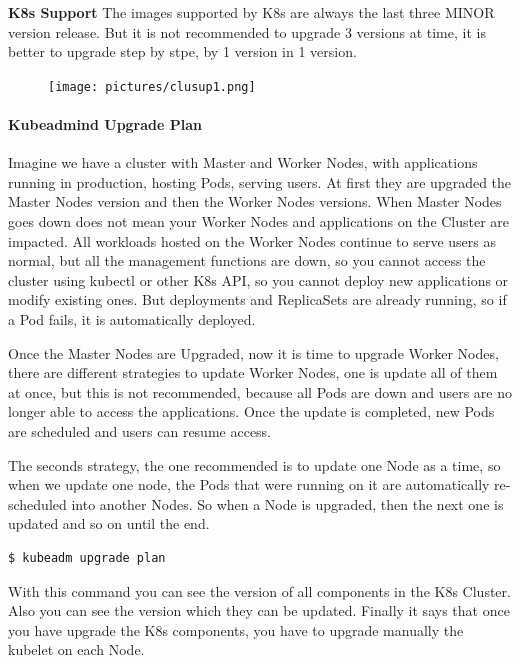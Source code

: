 \documentclass{article}
\newenvironment{codetemplate}[1][]{%
  \mybasecolorbox[#1]
  \itshape
}{%
  \endmybasecolorbox
}
\begin{document}
\textbf{K8s Support}
The images supported by K8s are always the last three MINOR version release. But it is not recommended to upgrade 3 versions at time, it is better to upgrade step by stpe, by 1 version in 1 version.

\begin{figure}[H]
    \texttt{[image: pictures/clusup1.png]}
\end{figure}

\paragraph{Kubeadmind Upgrade Plan}

Imagine we have a cluster with Master and Worker Nodes, with applications running in production, hosting Pods, serving users. At first they are upgraded the Master Nodes version and then the Worker Nodes versions. When Master Nodes goes down does not mean your Worker Nodes and applications on the Cluster are impacted. All workloads hosted on the Worker Nodes continue to serve users as normal, but all the management functions are down, so you cannot access the cluster using kubectl or other K8s API, so you cannot deploy new applications or modify existing ones.  But deployments and ReplicaSets are already running, so if a Pod fails, it is automatically deployed.

Once the Master Nodes are Upgraded, now it is time to upgrade Worker Nodes, there are different strategies to update Worker Nodes, one is update all of them at once, but this is not recommended, because all Pods are down and users are no longer able to access the applications. Once the update is completed, new Pods are scheduled and users can resume access.

The seconds strategy, the one recommended is to update one Node as a time, so when we update one node, the Pods that were running on it are automatically re-scheduled into another Nodes. So when a Node is upgraded, then the next one is updated and so on until the end.

\begin{codetemplate}{}
\begin{verbatim}
$ kubeadm upgrade plan
\end{verbatim}
\end{codetemplate}

With this command you can see the version of all components in the K8s Cluster. Also you can see the version which they can be updated. Finally it says that once you have upgrade the K8s components, you have to upgrade manually the kubelet on each Node.
\end{document}
